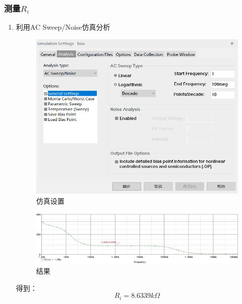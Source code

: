 \documentclass{../source/Experiment}
\begin{document}
            \subsubsection{测量$R_i$}
            \begin{enumerate}
                \item 利用AC Sweep/Noise仿真分析
                    \begin{figure}[h]
                        \centering
                        \includegraphics[scale = 0.6]{pic/仿真2}
                        \caption{仿真设置}
                    \end{figure}
                    \begin{figure}[h]
                        \centering
                        \includegraphics[scale = 0.4]{pic/ri}
                        \caption{结果}
                    \end{figure}
                    得到：
                    $$R_i = 8.6339k\Omega$$
            \end{enumerate}
\end{document}
